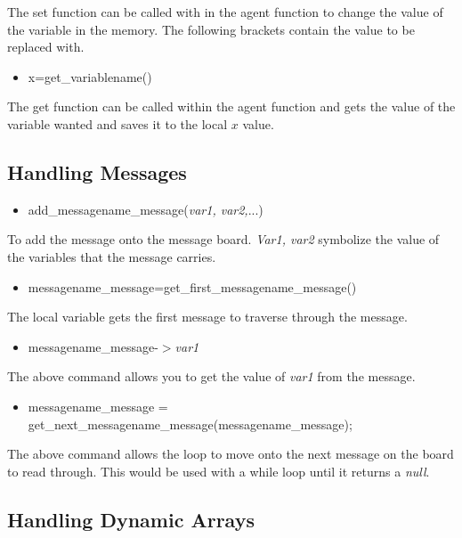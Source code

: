 \documentclass[a4paper,11pt]{article}
\begin{document}
The set function can be called with in the agent function to change
the value of the variable in the memory. The following brackets
contain the value to be replaced with. \begin{itemize} \item
x=get\_variablename()
\end{itemize}
The get function can be called within the agent function and gets
the value of the variable wanted and saves it to the local $x$
value.
\subsection{Handling Messages}
\begin{itemize}
\item add\_messagename\_message(\emph{var1, var2,}...)
\end{itemize}
To add the message onto the message board. \emph{Var1, var2}
symbolize the value of the variables that the message carries.
\begin{itemize}
\item messagename\_message=get\_first\_messagename\_message()
\end{itemize}
The local variable gets the first message to traverse through the
message.
\begin{itemize}
\item messagename\_message-$>$\emph{var1}
\end{itemize}
The above command allows you to get the value of \emph{var1} from
the message.
\begin{itemize}
\item messagename\_message =
get\_next\_messagename\_message(messagename\_message);
\end{itemize}
The above command allows the loop to move onto the next message on
the board to read through. This would be used with a while loop
until it returns a \emph{null}.

\subsection{Handling Dynamic Arrays}
\end{document}
